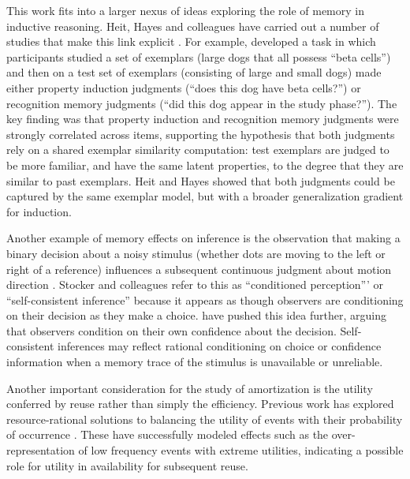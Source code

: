 This work fits into a larger nexus of ideas exploring the role of memory in inductive reasoning. Heit, Hayes and colleagues have carried out a number of studies that make this link explicit \citep{heit2011predicting,hayes2013relationship,hayes2013similar,hawkins2016dynamic}. For example, \citet{heit2011predicting} developed a task in which participants studied a set of exemplars (large dogs that all possess ``beta cells'') and then on a test set of exemplars (consisting of large and small dogs) made either property induction judgments (``does this dog have beta cells?'') or recognition memory judgments (``did this dog appear in the study phase?''). The key finding was that property induction and recognition memory judgments were strongly correlated across items, supporting the hypothesis that both judgments rely on a shared exemplar similarity computation: test exemplars are judged to be more familiar, and have the same latent properties, to the degree that they are similar to past exemplars. Heit and Hayes showed that both judgments could be captured by the same exemplar model, but with a broader generalization gradient for induction.

Another example of memory effects on inference is the observation that making a binary decision about a noisy stimulus (whether dots are moving to the left or right of a reference) influences a subsequent continuous judgment about motion direction \citep{jazayeri2007new}. Stocker and colleagues \citep{stocker2008bayesian,luu2016choice} refer to this as ``conditioned perception''' or ``self-consistent inference'' because it appears as though observers are conditioning on their decision as they make a choice. \citet{fleming2017self} have pushed this idea further, arguing that observers condition on their own confidence about the decision. Self-consistent inferences may reflect rational conditioning on choice or confidence information when a memory trace of the stimulus is unavailable or unreliable.

Another important consideration for the study of amortization is the utility conferred by reuse rather than simply the efficiency. Previous work has explored resource-rational solutions to balancing the utility of events with their probability of occurrence \citep{lieder2018overrepresentation, gershman2010neural,lieder2012burn,vul2014one}. These have successfully modeled effects such as the over-representation of low frequency events with extreme utilities, indicating a possible role for utility in availability for subsequent reuse.

